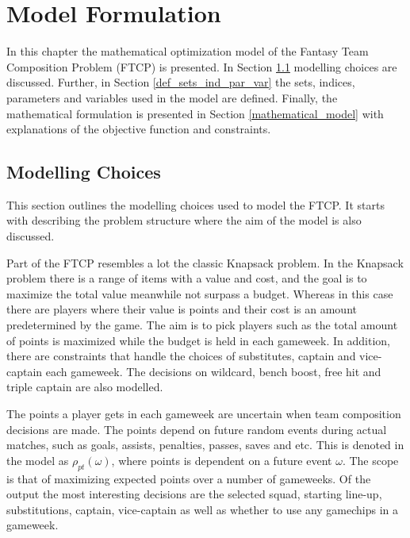 
\chapter{Model Formulation} \label{chapter_model_formulation}

In this chapter the mathematical optimization model of the Fantasy Team Composition Problem (FTCP) is presented. In Section \ref{modelling_choices} modelling choices are discussed. Further, in Section \ref{def_sets_ind_par_var} the sets, indices, parameters and variables used in the model are defined. Finally, the mathematical formulation is presented in Section \ref{mathematical_model} with explanations of the objective function and constraints. 


\section{Modelling Choices} \label{modelling_choices}

This section outlines the modelling choices used to model the FTCP. It starts with describing the problem structure where the aim of the model is also discussed.

\newpar

Part of the FTCP resembles a lot the classic Knapsack problem. In the Knapsack problem there is a range of items with a value and cost, and the goal is to maximize the total value meanwhile not surpass a budget. Whereas in this case there are players where their value is points and their cost is an amount predetermined by the game. The aim is to pick players such as the total amount of points is maximized while the budget is held in each gameweek. In addition, there are constraints that handle the choices of substitutes, captain and vice-captain each gameweek. The decisions on wildcard, bench boost, free hit and triple captain are also modelled. 

\newpar

The points a player gets in each gameweek are uncertain when team composition decisions are made. The points depend on future random events during actual matches, such as goals, assists, penalties, passes, saves and etc. This is denoted in the model as $\rho_{pt}(\omega)$, where points is dependent on a future event $\omega$. The scope is that of maximizing expected points over a number of gameweeks. Of the output the most interesting decisions are the selected squad, starting line-up, substitutions, captain, vice-captain as well as whether to use any gamechips in a gameweek. 

